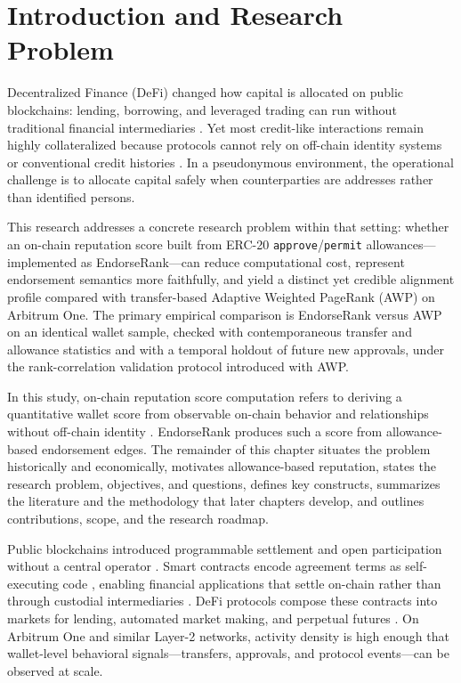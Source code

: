 \chapter{Introduction and Research Problem}
\label{ch:introduction}

Decentralized Finance (DeFi) changed how capital is allocated on public blockchains: lending, borrowing, and leveraged trading can run without traditional financial intermediaries . Yet most credit-like interactions remain highly collateralized because protocols cannot rely on off-chain identity systems or conventional credit histories . In a pseudonymous environment, the operational challenge is to allocate capital safely when counterparties are addresses rather than identified persons.

This research addresses a concrete research problem within that setting: whether an on-chain reputation score built from ERC-20 \texttt{approve}/\texttt{permit} allowances---implemented as EndorseRank---can reduce computational cost, represent endorsement semantics more faithfully, and yield a distinct yet credible alignment profile compared with transfer-based Adaptive Weighted PageRank (AWP) on Arbitrum One. The primary empirical comparison is EndorseRank versus AWP on an identical wallet sample, checked with contemporaneous transfer and allowance statistics and with a temporal holdout of future new approvals, under the rank-correlation validation protocol introduced with AWP.

In this study, on-chain reputation score computation refers to deriving a quantitative wallet score from observable on-chain behavior and relationships without off-chain identity . EndorseRank produces such a score from allowance-based endorsement edges. The remainder of this chapter situates the problem historically and economically, motivates allowance-based reputation, states the research problem, objectives, and questions, defines key constructs, summarizes the literature and the methodology that later chapters develop, and outlines contributions, scope, and the research roadmap.


Public blockchains introduced programmable settlement and open participation without a central operator . Smart contracts encode agreement terms as self-executing code , enabling financial applications that settle on-chain rather than through custodial intermediaries . DeFi protocols compose these contracts into markets for lending, automated market making, and perpetual futures . On Arbitrum One and similar Layer-2 networks, activity density is high enough that wallet-level behavioral signals---transfers, approvals, and protocol events---can be observed at scale.


